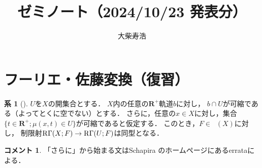 \documentclass[uplatex,dvipdfmx,a4paper,10pt,draft]{jsarticle}
\title{ゼミノート（2024/10/23 発表分）}
\author{大柴寿浩}
\theoremstyle{definition}
\newcommand{\rr}{\mathbf{R}}
\numberwithin{equation}{section}
\newcommand{\RG}{\mathop{\mathrm{R}\hspace{-0pt}\Gamma}\nolimits}
\theoremstyle{mystyle}
\newtheorem{CRL}[AXM]{系}
\newtheorem{CMT}[AXM]{コメント}
\newcommand{\Dlcon}{\mathop{\mathsf{D}^{+}_{\rr_{>0}}}\nolimits}
\begin{document}
\maketitle

\section{フーリエ・佐藤変換（復習）{\cite[\S 3.7]{KS90}}}

\begin{CRL}[{\cite[Corollary 3.7.3]{KS90}}]\label{373}
    \(U\)を\(X\)の開集合とする．
    \(X\)内の任意の\(\rr^{+}\)軌道\(b\)に対し，
    \(b\cap U\)が可縮である（よってとくに空でない）とする．
    さらに，任意の\(x\in X\)に対し，集合\(
        \{t\in\rr^{+};\mu(x,t)\in U\}
    \)が可縮であると仮定する．
    このとき，\(F\in\Dlcon(X)\)に対し，
    制限射\(\RG(X;F)\to\RG(U;F)\)は同型となる．
\end{CRL}

\begin{CMT}
    「さらに」から始まる文はSchapira のホームページにあるerrataによる．
\end{CMT}
\end{document}
